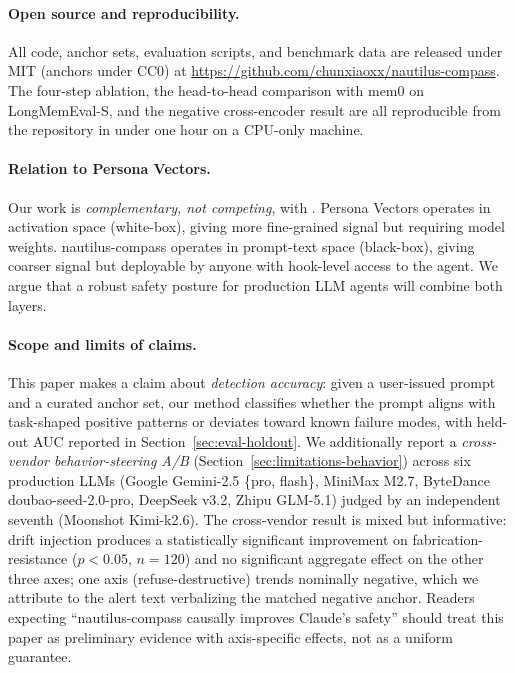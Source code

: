 \paragraph{Open source and reproducibility.}
All code, anchor sets, evaluation scripts, and benchmark data are
released under MIT (anchors under CC0) at
\url{https://github.com/chunxiaoxx/nautilus-compass}. The four-step
ablation, the head-to-head comparison with mem0 on LongMemEval-S,
and the negative cross-encoder result are all reproducible from
the repository in under one hour on a CPU-only machine.

\paragraph{Relation to Persona Vectors.}
Our work is \emph{complementary, not competing}, with
\citet{personavectors2025}. Persona Vectors operates in
activation space (white-box), giving more fine-grained signal but
requiring model weights. nautilus-compass operates in prompt-text space
(black-box), giving coarser signal but deployable by anyone with
hook-level access to the agent. We argue that a robust safety
posture for production LLM agents will combine both layers.

\paragraph{Scope and limits of claims.}
This paper makes a claim about \emph{detection accuracy}: given a
user-issued prompt and a curated anchor set, our method classifies
whether the prompt aligns with task-shaped positive patterns or
deviates toward known failure modes, with held-out AUC reported in
Section~\ref{sec:eval-holdout}. We additionally report a
\emph{cross-vendor behavior-steering A/B}
(Section~\ref{sec:limitations-behavior}) across six production LLMs
(Google Gemini-2.5 \{pro, flash\}, MiniMax M2.7,
ByteDance doubao-seed-2.0-pro, DeepSeek v3.2, Zhipu GLM-5.1) judged
by an independent seventh (Moonshot Kimi-k2.6). The cross-vendor
result is mixed but informative: drift injection produces a
statistically significant improvement on fabrication-resistance
($p < 0.05$, $n=120$) and no significant aggregate effect on the
other three axes; one axis (refuse-destructive) trends nominally
negative, which we attribute to the alert text verbalizing the
matched negative anchor. Readers expecting
``nautilus-compass causally improves Claude's safety'' should treat
this paper as preliminary evidence with axis-specific effects, not as
a uniform guarantee.
